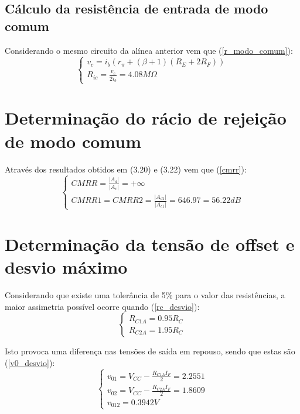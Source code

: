 \documentclass[a4paper,2pt]{report}
\begin{document}
\subsection{Cálculo da resistência de entrada de modo comum}

\par Considerando o mesmo circuito da alínea anterior vem que (\ref{r_modo_comum}):
\begin{equation}
    \begin{cases}
        v_c = i_b(r_\pi + (\beta + 1)(R_E + 2R_F)) \\
        R_{ic} = \frac{v_c}{2i_b} = 4.08M\Omega
    \end{cases}
    \label{r_modo_comum}
\end{equation}

\section{Determinação do rácio de rejeição de modo comum}

\par Através dos resultados obtidos em (3.20) e (3.22) vem que (\ref{cmrr}):
\begin{equation}
    \begin{cases}
        \textit{CMRR} = \frac{|A_d|}{|A_c|} = +\infty \\
        \textit{CMRR1} = \textit{CMRR2} = \frac{|A_{d1}|}{|A_{c1}|} = 646.97 = 56.22\textit{dB}
    \end{cases}
    \label{cmrr}
\end{equation}

\section{Determinação da tensão de offset e desvio máximo}
\par Considerando que existe uma tolerância de 5\% para o valor das resistências, a maior assimetria possível ocorre quando (\ref{rc_desvio}):
\begin{equation}
    \begin{cases}
        R_{C1A} = 0.95R_C \\
        R_{C2A} = 1.95R_C 
    \end{cases}
    \label{rc_desvio}
\end{equation}  

\par Isto provoca uma diferença nas tensões de saída em repouso, sendo que estas são (\ref{v0_desvio}):
\begin{equation}
    \begin{cases}
        v_{01} = V_{CC} - \frac{R_{C1A} I_F}{2} = 2.2551 \\
        v_{02} = V_{CC} - \frac{R_{C2A} I_F}{2} = 1.8609 \\
        v_{012} = 0.3942V
    \end{cases}
    \label{v0_desvio}
\end{equation}
\end{document}
